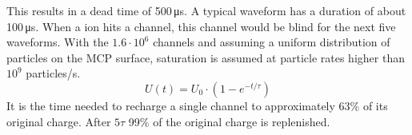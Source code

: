 		This results in a dead time of 500\,\si{\micro\second}. A typical waveform has a duration of about 100\,\si{\micro\second}. When a ion hits a channel, this channel would be blind for the next five waveforms. With the $1.6\cdot10^6$ channels and assuming a uniform distribution of particles on the MCP surface, saturation is assumed at particle rates higher than $10^9$ particles/\si{\second}. %
		\begin{equation}
			U(t) = U_0\cdot(1- e^{-t/\tau})
		\end{equation}
		It is the time needed to recharge a single channel to approximately 63\% of its original charge. After $5\tau$ 99\% of the original charge is replenished. %
		
		

